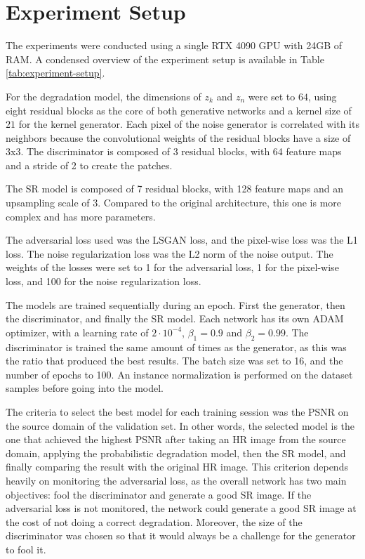 \section{Experiment Setup}

The experiments were conducted using a single RTX 4090 GPU with 24GB of RAM. A condensed overview of the experiment setup is available in Table \ref{tab:experiment-setup}.

For the degradation model, the dimensions of $z_k$ and $z_n$ were set to $64$, using eight residual blocks as the core of both generative networks and a kernel size of $21$ for the kernel generator. Each pixel of the noise generator is correlated with its neighbors because the convolutional weights of the residual blocks have a size of 3x3. The discriminator is composed of 3 residual blocks, with 64 feature maps and a stride of 2 to create the patches.

The SR model is composed of 7 residual blocks, with 128 feature maps and an upsampling scale of 3. Compared to the original architecture, this one is more complex and has more parameters.

The adversarial loss used was the LSGAN loss, and the pixel-wise loss was the L1 loss. The noise regularization loss was the L2 norm of the noise output. The weights of the losses were set to 1 for the adversarial loss, 1 for the pixel-wise loss, and 100 for the noise regularization loss.

The models are trained sequentially during an epoch. First the generator, then the discriminator, and finally the SR model. Each network has its own ADAM optimizer, with a learning rate of $2 \cdot 10^{-4}$,
 $\beta_1 = 0.9$ and $\beta_2 = 0.99$. The discriminator is trained the same amount of times as the generator, as this was the ratio that produced the best results. The batch size was set to 16, and the number of epochs to 100. An instance normalization is performed on the dataset samples before going into the model.

The criteria to select the best model for each training session was the PSNR on the source domain of the validation set. 
In other words, the selected model is the one that achieved the highest PSNR after taking an HR image from the source domain, applying the probabilistic degradation model, then the SR model, and finally comparing the result with the original HR image.
This criterion depends heavily on monitoring the adversarial loss, as the overall network has two main objectives: fool the discriminator and generate a good SR image. If the adversarial loss is not monitored, the network could generate a good SR image at the cost of not doing a correct degradation. Moreover, the size of the discriminator was chosen so that it would always be a challenge for the generator to fool it.

